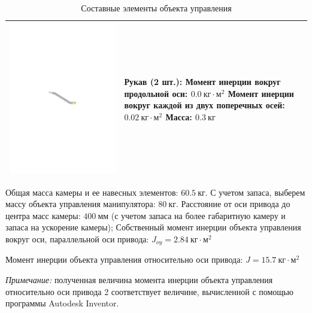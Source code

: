 \begin{table}[ht!]
\begin{tabularx}{\textwidth}{c|L}
            \includegraphics[height=0.1\textwidth, keepaspectratio]
                            {./src/pictures/sattelite_3d_images/sleeve} &
            \parbox{\linewidth}{
                \textbf{Рукав (2 шт.):}                                                                         \\
                Момент инерции вокруг продольной оси: $0.0 ~\textit{кг} \cdot \textit{м}^{2}$                   \\
                Момент инерции вокруг каждой из двух поперечных  осей: $0.02 ~\textit{кг} \cdot \textit{м}^{2}$ \\
                Масса: $0.3 ~\textit{кг}$                                                                       \\
            }                                                                                                       \\ \hline
    \end{tabularx}

    \caption{Составные элементы объекта управления}
\end{table}

Общая масса камеры и ее навесных элементов: $60.5 ~\textit{кг}$. С учетом запаса, выберем
массу объекта управления манипулятора: $80 ~\textit{кг}$.
Расстояние от оси привода до центра масс камеры: $400 ~\textit{мм}$ (с учетом запаса
на более габаритную камеру и запаса на ускорение камеры);
Собственный момент инерции объекта управления вокруг оси, параллельной оси привода:
$ J_{oy} = 2.84 ~\textit{кг} \cdot \textit{м}^2 $

Момент инерции объекта управления относительно оси привода:
$ J = 15.7 ~\textit{кг} \cdot \textit{м}^2 $

\textit{Примечание:} полученная величина момента инерции объекта управления относительно
оси привода 2 соответствует величине, вычисленной с помощью программы Autodesk Inventor.
